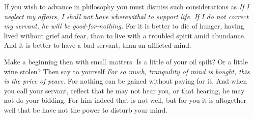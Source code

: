 If you  wish to advance in  philosophy you must dismiss  such considerations as
\emph{If I neglect my affairs, I shall not have wherewithal to support life. If
I do not correct my servant, he  will be good-for-nothing.} For it is better to
die  of hunger,  having lived  without  grief and  fear,  than to  live with  a
troubled spirit amid abundance. And it is better to have a bad servant, than an
afflicted mind.

Make a beginning then  with small matters. Is a little of your  oil spilt? Or a
little wine stolen? Then say to yourself \emph{For so much, tranquility of mind
is bought,  this is  the price  of peace.}  For nothing  can be  gained without
paying for  it, And when you  call your servant,  reflect that he may  not hear
you, or that  hearing, he may not do  your bidding. For him indeed  that is not
well, but for you  it is altogether well that be have not  the power to disturb
your mind.
